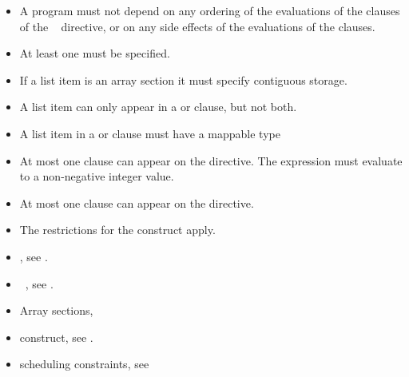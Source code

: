 \restrictions
\begin{itemize}
\item A program must not depend on any ordering of the evaluations of the clauses of the 
~ directive, or on any side effects of the evaluations of the clauses. 

\item At least one  must be specified.

\item If a list item is an array section it must specify contiguous storage. 


\item A list item can only appear in a  or  clause, but not both.

\item A list item in a  or  clause must have a mappable type

\item At most one  clause can appear on the directive. The  expression 
must evaluate to a non-negative integer value.

\item At most one  clause can appear on the directive. 

\item The restrictions for the  construct apply. 
\end{itemize}

\crossreferences
\begin{itemize}
\item {}, see 
.

\item {}~, see 
. 

\item Array sections, 

\item {} construct, see 
.

\item {} scheduling constraints, see 


\end{itemize}











